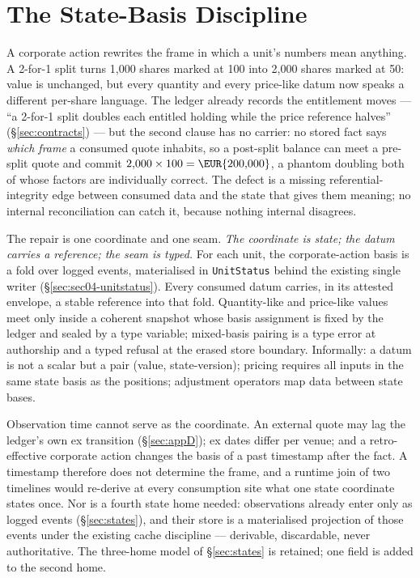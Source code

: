 \section{The State-Basis Discipline}
\label{sec:basis}
\label{sec:state-basis}

A corporate action rewrites the frame in which a unit's numbers mean anything. A 2-for-1
split turns 1{,}000 shares marked at 100 into 2{,}000 shares marked at 50: value is
unchanged, but every quantity and every price-like datum now speaks a different per-share
language. The ledger already records the entitlement moves --- ``a 2-for-1 split doubles
each entitled holding while the price reference halves'' (\S\ref{sec:contracts}) --- but
the second clause has no carrier: no stored fact says \emph{which frame} a consumed quote
inhabits, so a post-split balance can meet a pre-split quote and commit
$2{,}000\times100=\EUR{200{,}000}$, a phantom doubling both of whose factors are
individually correct. The defect is a missing referential-integrity edge between consumed
data and the state that gives them meaning; no internal reconciliation can catch it,
because nothing internal disagrees.

The repair is one coordinate and one seam. \emph{The coordinate is state; the datum
carries a reference; the seam is typed.} For each unit, the corporate-action basis is a
fold over logged events, materialised in \texttt{UnitStatus} behind the existing single
writer (\S\ref{sec:sec04-unitstatus}). Every consumed datum carries, in its attested
envelope, a stable reference into that fold. Quantity-like and price-like values meet
only inside a coherent snapshot whose basis assignment is fixed by the ledger and sealed
by a type variable; mixed-basis pairing is a type error at authorship and a typed refusal
at the erased store boundary. Informally: a datum is not a scalar but a pair (value,
state-version); pricing requires all inputs in the same state basis as the positions;
adjustment operators map data between state bases.

Observation time cannot serve as the coordinate. An external quote may lag the ledger's
own ex transition (\S\ref{sec:appD}); ex dates differ per venue; and a retro-effective
corporate action changes the basis of a past timestamp after the fact. A timestamp
therefore does not determine the frame, and a runtime join of two timelines would
re-derive at every consumption site what one state coordinate states once. Nor is a
fourth state home needed: observations already enter only as logged events
(\S\ref{sec:states}), and their store is a materialised projection of those events under
the existing cache discipline --- derivable, discardable, never authoritative. The
three-home model of \S\ref{sec:states} is retained; one field is added to the second
home.

